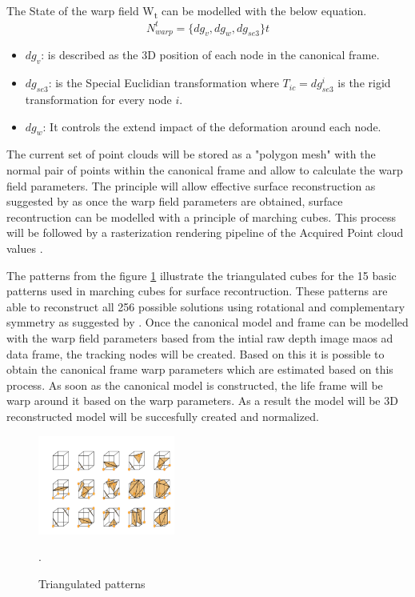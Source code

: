 \documentclass[12pt]{report}
\begin{document}
The State of the warp field W\textsubscript{t} can be modelled with the below equation.
\[N_{warp}^t=\{dg_v,dg_w,dg_{se3}\}t\]
\begin{itemize}[label =]
    \item $dg_{v}$: is described as the 3D position of each node in the canonical frame. 
    \item $dg_{se3}$: is the Special Euclidian transformation where $T_{ic}=dg_{se3} ^ {i}$ is the rigid transformation for every node $i$.
    \item $dg_{w}$: It controls the extend impact of the deformation around each node.
\end{itemize}

The current set of point clouds will be stored  as a "polygon mesh" with the normal pair of points within the canonical frame and allow to calculate the warp field parameters. 
The principle will allow effective surface reconstruction as suggested by  as once the warp field parameters are obtained, surface recontruction can be modelled with a principle of marching cubes.
This process will be followed by a rasterization rendering pipeline of the Acquired Point cloud values .

The patterns from the figure \ref{fig:patterns} illustrate the triangulated cubes for the 15 basic patterns used in marching cubes for surface recontruction.
These patterns are able to reconstruct all  256 possible solutions using rotational and  complementary symmetry as suggested by .
Once the canonical model and frame can be modelled with the warp field parameters based from the intial raw depth image maos ad data frame, the tracking nodes will be created.
Based on this it is possible to obtain the canonical frame warp parameters which  are estimated based on this process. 
As soon as the canonical model is constructed, the life frame will be warp around it based on the warp parameters. As a result the model will be 3D reconstructed model will be succesfully created and normalized.
\begin{figure} %
    \centering
    \includegraphics[width=0.4\textwidth]{shapes.png}
    \caption{Triangulated patterns} \cite[]{fang_zhao_wen_zhang_2018}.
    \label{fig:patterns}
\end{figure}
\end{document}

